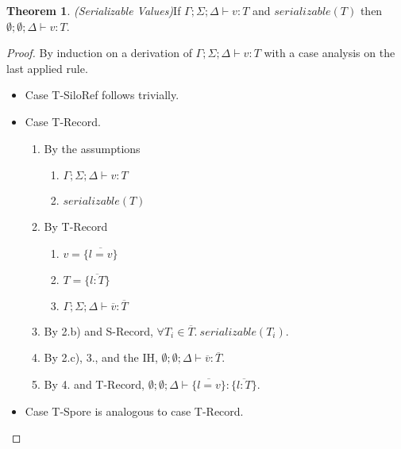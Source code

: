 \documentclass{article}
\theoremstyle{definition}
\newtheorem{thm}{Theorem}[section]
\newcommand{\seq}[1]{\overline{#1}}
\begin{document}
\begin{thm}
\emph{(Serializable Values)}\label{lem:ser-values}
If $\Gamma ; \Sigma ; \Delta \vdash v : T$ and $serializable(T)$ then $\emptyset ; \emptyset ; \Delta \vdash v : T$.
\end{thm}
\begin{proof}
By induction on a derivation of $\Gamma ; \Sigma ; \Delta \vdash v : T$ with a case analysis on the last applied rule.

\begin{itemize}
\item Case T-SiloRef follows trivially.

\item Case T-Record.
\begin{enumerate}
\item By the assumptions
  \begin{enumerate}[label=(\alph*)]
  \item $\Gamma ; \Sigma ; \Delta \vdash v : T$
  \item $serializable(T)$
  \end{enumerate}
\item By T-Record
  \begin{enumerate}[label=(\alph*)]
  \item $v = \{\seq{l = v}\}$
  \item $T = \{\seq{l : T}\}$
  \item $\Gamma ; \Sigma ; \Delta \vdash \seq{v} : \seq{T}$
  \end{enumerate}
\item By 2.b) and S-Record, $\forall T_i \in \seq{T}.~serializable(T_i)$.
\item By 2.c), 3., and the IH, $\emptyset ; \emptyset ; \Delta \vdash \seq{v} : \seq{T}$.
\item By 4. and T-Record, $\emptyset ; \emptyset ; \Delta \vdash \{\seq{l = v}\} : \{\seq{l : T}\}$.
\end{enumerate}

\item Case T-Spore is analogous to case T-Record.
\end{itemize}
\end{proof}
\end{document}
